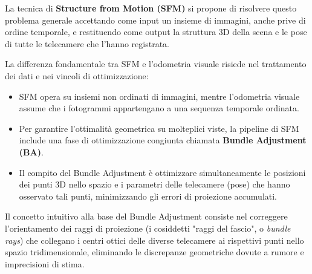 ﻿\documentclass[11pt, a4paper]{article}
\begin{document}
La tecnica di \textbf{Structure from Motion (SFM)} si propone di risolvere questo problema generale accettando come input un insieme di immagini, anche prive di ordine temporale, e restituendo come output la struttura 3D della scena e le pose di tutte le telecamere che l'hanno registrata.


La differenza fondamentale tra SFM e l'odometria visuale risiede nel trattamento dei dati e nei vincoli di ottimizzazione:
\begin{itemize}
    \item SFM opera su insiemi non ordinati di immagini, mentre l'odometria visuale assume che i fotogrammi appartengano a una sequenza temporale ordinata.
    \item Per garantire l'ottimalità geometrica su molteplici viste, la pipeline di SFM include una fase di ottimizzazione congiunta chiamata \textbf{Bundle Adjustment (BA)}.
    \item Il compito del Bundle Adjustment è ottimizzare simultaneamente le posizioni dei punti 3D nello spazio e i parametri delle telecamere (pose) che hanno osservato tali punti, minimizzando gli errori di proiezione accumulati.
\end{itemize}


Il concetto intuitivo alla base del Bundle Adjustment consiste nel correggere l'orientamento dei raggi di proiezione (i cosiddetti "raggi del fascio", o \emph{bundle rays}) che collegano i centri ottici delle diverse telecamere ai rispettivi punti nello spazio tridimensionale, eliminando le discrepanze geometriche dovute a rumore e imprecisioni di stima.


\end{document}
